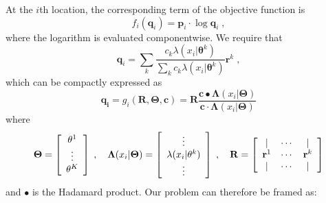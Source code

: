 \documentclass[english]{scrartcl}
\begin{document}
At the $i$th location, the corresponding term of the objective function is 
\begin{equation}
	f_i(\mathbf{q}_i) = \mathbf{p}_i \cdot \log \mathbf{q}_i\;, 
\end{equation}
where the logarithm is evaluated componentwise. We require that 
\begin{equation}
	\mathbf{q}_i = \sum_k \frac{c_k \lambda(x_i|\mathbf{\theta}^k)}{\sum_k c_k \lambda(x_i|\mathbf{\theta}^k)} \mathbf{r}^k\;,
\end{equation}
which can be compactly expressed as 
\begin{equation}
	\mathbf{q_i} = g_i(\mathbf{R}, \mathbf{\Theta}, \mathbf{c}) = \mathbf{R}  \frac{ \mathbf{c} \bullet \mathbf{\Lambda}(x_i|\mathbf{\Theta}) }{\mathbf{c} \cdot \mathbf{\Lambda}(x_i|\mathbf{\Theta})} 
\end{equation}
where 
\begin{align}
	\mathbf{\Theta} = \left[\begin{array}{c} \theta^1 \\ \vdots \\ \theta^K \end{array}\right]\;,\quad
	\mathbf{\Lambda}(x_i|\mathbf{\Theta}) = \left[\begin{array}{c} \vdots \\ \lambda(x_i|\theta^k) \\ \vdots
	\end{array}\right] \;, \quad
	\mathbf{R} = \left[\begin{array}{c c c}
	| & \cdots & | \\  
	\mathbf{r}^1 & \cdots & \mathbf{r}^k  \\
	| & \cdots & | \\  \end{array}\right]
\end{align}
and $\bullet$ is the Hadamard product. Our problem can therefore be framed as: 
\end{document}
